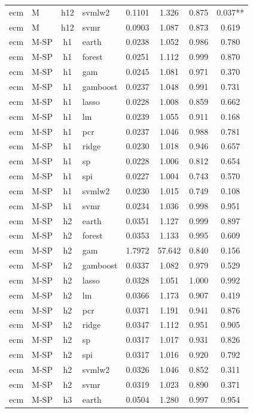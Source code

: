 \begin{ThreePartTable}
\begin{longtable}[t]{llclcccc}
ecm & M & h12 & svmlw2 & 0.1101 & 1.326 & 0.875 & 0.037**\\
ecm & M & h12 & svmr & 0.0903 & 1.087 & 0.873 & 0.619\\
\addlinespace
ecm & M-SP & h1 & earth & 0.0238 & 1.052 & 0.986 & 0.780\\
ecm & M-SP & h1 & forest & 0.0251 & 1.112 & 0.999 & 0.870\\
ecm & M-SP & h1 & gam & 0.0245 & 1.081 & 0.971 & 0.370\\
ecm & M-SP & h1 & gamboost & 0.0237 & 1.048 & 0.991 & 0.731\\
ecm & M-SP & h1 & lasso & 0.0228 & 1.008 & 0.859 & 0.662\\
ecm & M-SP & h1 & lm & 0.0239 & 1.055 & 0.911 & 0.168\\
ecm & M-SP & h1 & pcr & 0.0237 & 1.046 & 0.988 & 0.781\\
ecm & M-SP & h1 & ridge & 0.0230 & 1.018 & 0.946 & 0.657\\
ecm & M-SP & h1 & sp & 0.0228 & 1.006 & 0.812 & 0.654\\
ecm & M-SP & h1 & spi & 0.0227 & 1.004 & 0.743 & 0.570\\
ecm & M-SP & h1 & svmlw2 & 0.0230 & 1.015 & 0.749 & 0.108\\
ecm & M-SP & h1 & svmr & 0.0234 & 1.036 & 0.998 & 0.951\\
\addlinespace
ecm & M-SP & h2 & earth & 0.0351 & 1.127 & 0.999 & 0.897\\
ecm & M-SP & h2 & forest & 0.0353 & 1.133 & 0.995 & 0.609\\
ecm & M-SP & h2 & gam & 1.7972 & 57.642 & 0.840 & 0.156\\
ecm & M-SP & h2 & gamboost & 0.0337 & 1.082 & 0.979 & 0.529\\
ecm & M-SP & h2 & lasso & 0.0328 & 1.051 & 1.000 & 0.992\\
ecm & M-SP & h2 & lm & 0.0366 & 1.173 & 0.907 & 0.419\\
ecm & M-SP & h2 & pcr & 0.0371 & 1.191 & 0.941 & 0.876\\
ecm & M-SP & h2 & ridge & 0.0347 & 1.112 & 0.951 & 0.905\\
ecm & M-SP & h2 & sp & 0.0317 & 1.017 & 0.931 & 0.826\\
ecm & M-SP & h2 & spi & 0.0317 & 1.016 & 0.920 & 0.792\\
ecm & M-SP & h2 & svmlw2 & 0.0326 & 1.046 & 0.852 & 0.311\\
ecm & M-SP & h2 & svmr & 0.0319 & 1.023 & 0.890 & 0.371\\
\addlinespace
ecm & M-SP & h3 & earth & 0.0504 & 1.280 & 0.997 & 0.954\\

\end{longtable}
\end{ThreePartTable}
